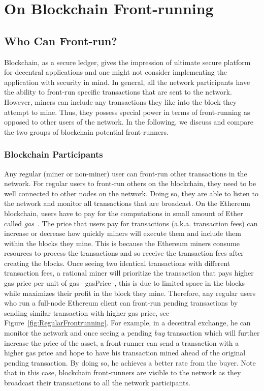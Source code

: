 \section{On Blockchain Front-running}

\subsection{Who Can Front-run?}
\label{sec:who can front-run?}

Blockchain, as a secure ledger, gives the impression of ultimate secure platform for decentral applications and one might not consider implementing the application with security in mind. In general, all the network participants have the ability to front-run specific transactions that are sent to the network. However, miners can include any transactions they like into the block they attempt to mine. Thus, they possess special power in terms of front-running as opposed to other users of the network. In the following, we discuss and compare the two groups of blockchain potential front-runners.

\subsubsection{Blockchain Participants}
Any regular (miner or non-miner) user can front-run other transactions in the network. For regular users to front-run others on the blockchain, they need to be well connected to other nodes on the network. Doing so, they are able to listen to the network and monitor all transactions that are broadcast. On the Ethereum blockchain, users have to pay for the computations in small amount of Ether called \textit{gas}~\cite{AccountT67:online}. The price that users pay for transactions (a.k.a. transaction fees) can increase or decrease how quickly miners will execute them and include them within the blocks they mine. This is because the Ethereum miners consume resources to process the transactions and so receive the transaction fees after creating the blocks. Once seeing two identical transactions with different transaction fees,  a rational miner will prioritize the transaction that pays higher gas price per unit of gas --gasPrice--, this is due to limited space in the blocks while maximizes their profit in the block they mine. Therefore, any regular users who run a full-node Ethereum client can front-run pending transactions by sending similar transaction with higher gas price, see Figure~\ref{fig:RegularFrontrunning}. For example, in a decentral exchange, he can monitor the network and once seeing a pending \textit{buy} transaction which will further increase the price of the asset, a front-runner can send a transaction with a higher gas price and hope to have his transaction mined ahead of the original pending transaction. By doing so, he achieves a better rate from the buyer. Note that in this case, blockchain front-runners are visible to the network as they broadcast their transactions to all the network participants.  

